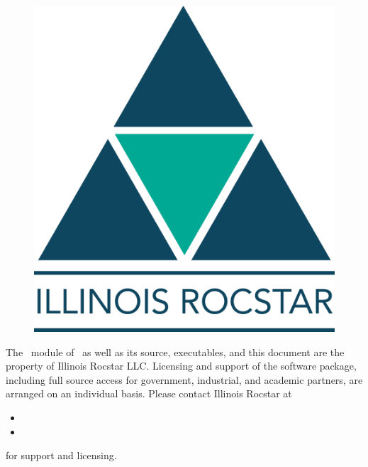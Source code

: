 \begin{figure}
  \centering
  \includegraphics[height=3.in]{../Figures/IR_Logo.png}
\end{figure}
\irtitle{\rightHeader}

\date{\textsf{\today}}

\pagestyle{empty}
\maketitle

\irheader{\rightHeader}{\midHeader}


The \Rocburn\ module of \Rocstar\ as well as its source, executables, and this document are the property of Illinois Rocstar LLC. Licensing and support of the software package, including full source access for government, industrial, and academic partners, are arranged on an individual basis. Please contact Illinois Rocstar at 
\begin{itemize}
  \item {}
  \item {}
\end{itemize}
for support and licensing.

\newpage

\setcounter{page}{1}
\pagestyle{plain}
